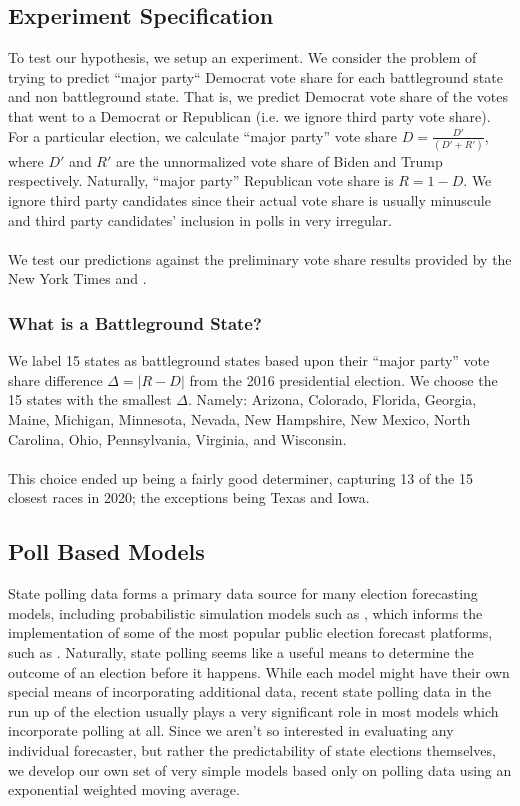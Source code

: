 \subsection{Experiment Specification}
To test our hypothesis, we setup an experiment. We consider the problem of trying to predict ``major party`` Democrat vote share for each battleground state and non battleground state. That is, we predict Democrat vote share of the votes that went to a Democrat or Republican (i.e. we ignore third party vote share). For a particular election, we calculate ``major party'' vote share $D = \frac{D'}{(D' + R')}$, where $D'$ and $R'$ are the unnormalized vote share of Biden and Trump respectively. Naturally, ``major party'' Republican vote share is $R = 1-D$. We ignore third party candidates since their actual vote share is usually minuscule and third party candidates' inclusion in polls in very irregular.
\\~\\
We test our predictions against the preliminary vote share results provided by the New York Times and \cite{scraper}.

\subsubsection{What is a Battleground State?}
We label 15 states as battleground states based upon their ``major party'' vote share difference $\Delta = |R - D|$ from the 2016 presidential election. We choose the 15 states with the smallest $\Delta$. Namely: Arizona, Colorado, Florida, Georgia, Maine, Michigan, Minnesota, Nevada, New Hampshire, New Mexico, North Carolina, Ohio, Pennsylvania, Virginia, and Wisconsin.
\\~\\
This choice ended up being a fairly good determiner, capturing 13 of the 15 closest races in 2020; the exceptions being Texas and Iowa.

\subsection{Poll Based Models}
State polling data forms a primary data source for many election forecasting models, including probabilistic simulation models such as \cite{Linzer2013DynamicBF}, which informs the implementation of some of the most popular public election forecast platforms, such as \cite{fivethirtyeight, economist}. Naturally, state polling seems like a useful means to determine the outcome of an election before it happens. While each model might have their own special means of incorporating additional data, recent state polling data in the run up of the election usually plays a very significant role in most models which incorporate polling at all. Since we aren't so interested in evaluating any individual forecaster, but rather the predictability of state elections themselves, we develop our own set of very simple models based only on polling data using an exponential weighted moving average.

